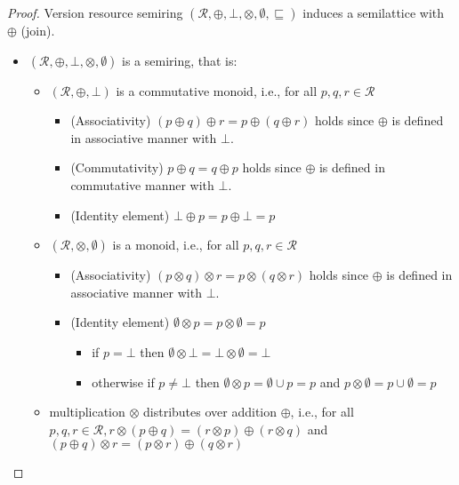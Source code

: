 \begin{lemma}
\label{proof:semiring}
\end{lemma}
\begin{proof}
Version resource semiring $(\mathcal{R},\oplus,\bot,\otimes,\emptyset,\sqsubseteq)$ induces a semilattice with $\oplus$ (join).
\begin{itemize}
\item $(\mathcal{R},\oplus,\bot,\otimes,\emptyset)$ is a semiring, that is:
    \begin{itemize}
        \item $(\mathcal{R},\oplus,\bot)$ is a commutative monoid, i.e., for all $p,q,r\in\mathcal{R}$
        \begin{itemize}
            \item (Associativity) $(p\oplus q) \oplus r = p\oplus (q \oplus r)$ holds since $\oplus$ is defined in associative manner with $\bot$.
            \item (Commutativity) $p\oplus q = q\oplus p$  holds since $\oplus$ is defined in commutative manner with $\bot$.
            \item (Identity element) $\bot \oplus p = p \oplus \bot = p$
        \end{itemize}
        \item $(\mathcal{R},\otimes,\emptyset)$ is a monoid, i.e., for all $p,q,r\in\mathcal{R}$
        \begin{itemize}
            \item (Associativity) $(p\otimes q) \otimes r = p\otimes (q \otimes r)$ holds since $\oplus$ is defined in associative manner with $\bot$.
            \item (Identity element) $\emptyset \otimes p = p \otimes \emptyset = p$
            \begin{itemize}
                \item if $p = \bot$ then $\emptyset \otimes \bot = \bot \otimes \emptyset = \bot$
                \item otherwise if $p \neq \bot$ then $\emptyset \otimes p = \emptyset \cup p = p$ and $p \otimes \emptyset = p \cup \emptyset = p$
            \end{itemize}
        \end{itemize}
        \item multiplication $\otimes$ distributes over addition $\oplus$, i.e., for all $p, q, r \in \mathcal{R},r\otimes(p\oplus q) = (r\otimes p) \oplus (r \otimes q)$ and $(p\oplus q)\otimes r = (p\otimes r) \oplus (q \otimes r)$

\end{itemize}
\end{itemize}
\end{proof}
